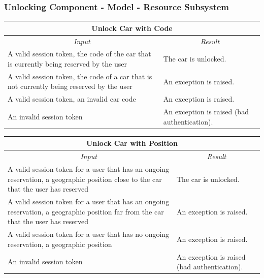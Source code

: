 \documentclass[english]{article}
\begin{document}
\newpage
\subsubsection{Unlocking Component - Model - Resource Subsystem}

\begin{center}
	\begin{tabular}{ | p{6cm} | p{6cm} | }
		\hline 
		\multicolumn{2}{|c|}{\textbf{Unlock Car with Code}} \\
		\hline
		\multicolumn{1}{|c|}{\textit{Input}} & \multicolumn{1}{c|}{\textit{Result}} \\
		\hline
		A valid session token, the code of the car that is currently being reserved by the user & The car is unlocked. \\
		\hline
		A valid session token, the code of a car that is not currently being reserved by the user & An exception is raised. \\
		\hline
		A valid session token, an invalid car code & An exception is raised. \\
		\hline
		An invalid session token & An exception is raised (bad authentication). \\
		\hline
	\end{tabular}
\end{center}

\begin{center}
	
	\begin{tabular}{ | p{6cm} | p{6cm} | }
		\hline 
		\multicolumn{2}{|c|}{\textbf{Unlock Car with Position}} \\
		\hline
		\multicolumn{1}{|c|}{\textit{Input}} & \multicolumn{1}{c|}{\textit{Result}} \\
		\hline
		A valid session token for a user that has an ongoing reservation, a geographic position close to the car that the user has reserved  & The car is unlocked. \\
		\hline
		A valid session token for a user that has an ongoing reservation, a geographic position far from the car that the user has reserved & An exception is raised. \\
		\hline
		A valid session token for a user that has no ongoing reservation, a geographic position & An exception is raised. \\
		\hline
		An invalid session token & An exception is raised (bad authentication). \\
		\hline
	\end{tabular}
\end{center}
\end{document}
